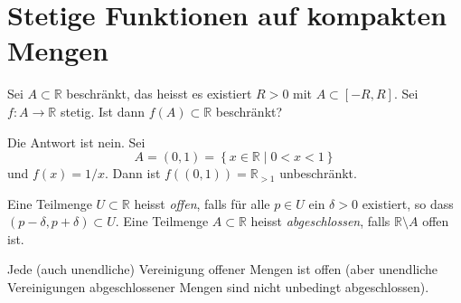 \documentclass[../main.tex]{subfiles}
\begin{document}
\section{Stetige Funktionen auf kompakten Mengen}

\begin{question}
Sei $A \subset \mathbb{R}$ beschränkt,
das heisst es existiert $R > 0$ 
mit $A \subset [-R, R]$.
Sei $f \colon A \to \mathbb{R}$ stetig.
Ist dann $f(A) \subset \mathbb{R}$ beschränkt?
\end{question}

\begin{example}
  Die Antwort ist nein. Sei 
  \[
    A = (0, 1) = \left\{x \in \mathbb{R} \mid 0 < x < 1\right\}
  \]
  und $f(x) = 1/x$. Dann ist $f((0, 1)) = \mathbb{R}_{>1}$ 
  unbeschränkt.
\end{example}

\begin{definition}
  Eine Teilmenge
  $U \subset \mathbb{R}$ 
  heisst \emph{offen},
  falls für
  alle $p \in U$ ein
  $\delta > 0$ existiert,
  so dass $(p - \delta, p + \delta)
  \subset U$.
Eine Teilmenge
  $A \subset \mathbb{R}$ 
  heisst  \emph{abgeschlossen},
  falls $\mathbb{R} \setminus A$ 
  offen ist.
\end{definition}

\begin{remark}
  Jede (auch unendliche) Vereinigung offener Mengen ist offen
  (aber unendliche Vereinigungen abgeschlossener Mengen
  sind nicht unbedingt abgeschlossen).
\end{remark}
\end{document}

